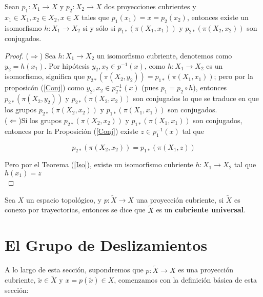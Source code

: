 \begin{theorem}

Sean $p_1: X_1 \rightarrow X$ y $p_2: X_2 \rightarrow X$ dos proyecciones cubrientes y $x_1 \in X_1, x_2 \in X_2, x \in X$ tales que $p_1(x_1)=x=p_2(x_2)$, entonces existe un isomorfismo $h: X_1 \rightarrow X_2$ si y s\'olo si $p_{1*}(\pi(X_1,x_1))$ y $p_{2*}(\pi(X_2,x_2))$ son conjugados.\\ 

\end{theorem}

\begin{proof}
($\Rightarrow$) Sea $h: X_1 \rightarrow X_2$ un isomorfismo cubriente, denotemos como $y_2=h(x_1)$. Por hip\'otesis $y_2,x_2 \in p^{-1}(x)$, como $h: X_1 \rightarrow X_2$ es un isomorfismo, significa que $p_{2*}(\pi(X_2,y_2))= p_{1*}(\pi(X_1,x_1))$; pero por la proposic\'on (\ref{Conj}) como $y_2,x_2 \in p^{-1}_{2*}(x)$ (pues $p_1=p_2 \circ h$), entonces $p_{2*}(\pi(X_2,y_2))$ y $p_{2*}(\pi(X_2,x_2))$ son conjugados lo que se traduce en que los grupos $p_{2*}(\pi(X_2,x_2))$ y $p_{1*}(\pi(X_1,x_1))$ son conjugados.\\

($\Leftarrow$)Si los grupos $p_{2*}(\pi(X_2,x_2))$ y $p_{1*}(\pi(X_1,x_1))$ son conjugados, entonces por la Proposici\'on (\ref{Conj}) existe $z \in p^{-1}_1(x)$ tal que 

$$p_{2*}(\pi(X_2,x_2))=p_{1*}(\pi(X_1,z))$$

Pero por el Teorema (\ref{Iso}), existe un isomorfismo cubriente $h:X_1 \rightarrow X_2$ tal que $h(x_1)=z$\\
\end{proof}

\begin{definition}
Sea $X$ un espacio topol\'ogico, y $p: \widetilde{X} \rightarrow X$ una proyecci\'on cubriente, si $\widetilde{X}$ es conexo por trayectorias, entonces se dice que $\widetilde{X}$ es un \textbf{cubriente universal}.
\end{definition}


\section{El Grupo de Deslizamientos}

A lo largo de esta secci\'on, supondremos que $p:\widetilde{X} \rightarrow X$ es una proyecci\'on cubriente, $\widetilde{x} \in \widetilde{X}$ y $x=p(\widetilde{x}) \in X$, comenzamos con la definici\'on b\'asica de esta secci\'on: 

